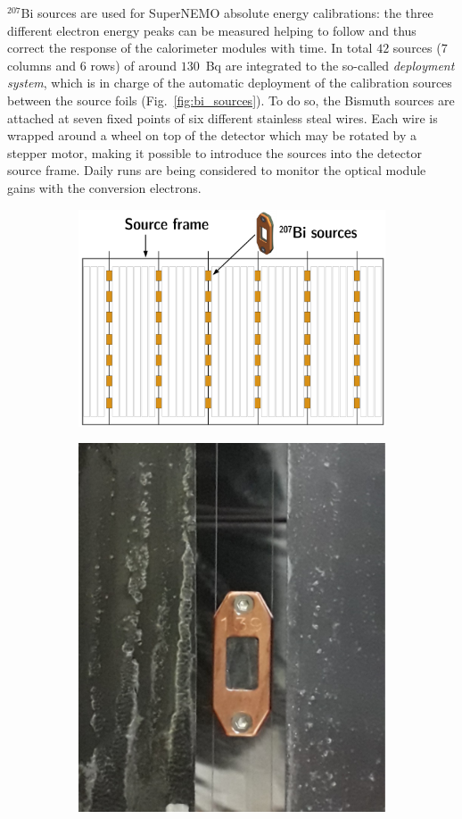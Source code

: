 $^{207}$Bi sources are used for SuperNEMO absolute energy calibrations: the three different electron energy peaks can be measured helping to follow and thus correct the response of the calorimeter modules with time.
In total $42$ sources ($7$ columns and $6$ rows) of around $130$~Bq are integrated to the so-called \emph{deployment system}, which is in charge of the automatic deployment of the calibration sources between the source foils (Fig.~\ref{fig:bi_sources}).
To do so, the Bismuth sources are attached at seven fixed points of six different stainless steal wires.
Each wire is wrapped around a wheel on top of the detector which may be rotated by a stepper motor, making it possible to introduce the sources into the detector source frame.
Daily runs are being considered to monitor the optical module gains with the conversion electrons.
\begin{figure}[!h]
  \centering
  \begin{subfigure}[t]{0.49\textwidth}
    \centering
    \includegraphics[height=0.8\textwidth]{SNdemonstrator/fig_SNdemonstrator/bi_sources_position.pdf}
  \end{subfigure}
  \hfill
  \begin{subfigure}[t]{0.49\textwidth}
    \centering
    \includegraphics[height=0.8\textwidth]{SNdemonstrator/fig_SNdemonstrator/bi_source_pic.pdf}

\end{subfigure}
\end{figure}
